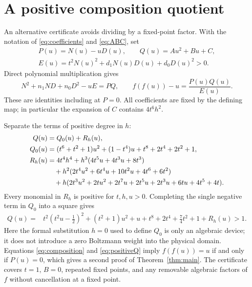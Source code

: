 \documentclass[11pt,a4paper]{article}
\numberwithin{equation}{section}
\begin{document}
\appendix
\section{A positive composition quotient}
\label{sec:certificate}
An alternative certificate avoids dividing by a fixed-point factor.
With the notation of \eqref{eq:coefficients} and \eqref{eq:ABC}, set
\begin{equation}
\begin{gathered}
 P(u)=N(u)-uD(u),\qquad Q(u)=Au^2+Bu+C,\\
 E(u)=t^2N(u)^2+d_1N(u)D(u)+d_0D(u)^2>0.
\end{gathered}
\label{eq:PQE}
\end{equation}
Direct polynomial multiplication gives
\begin{equation}
 N^2+n_1ND+n_0D^2-uE=PQ,
 \qquad f(f(u))-u=\frac{P(u)Q(u)}{E(u)}.
 \label{eq:composition}
\end{equation}
These are identities including at $P=0$. All coefficients are fixed
by the defining map; in particular the expansion of $C$ contains
$4t^6h^2$.

Separate the terms of positive degree in $h$:
\begin{align}
 Q(u)&=Q_0(u)+R_h(u),\label{eq:Qsplit}\\
 Q_0(u)&=(t^6+t^2+1)u^2+(1-t^4)u+t^8+2t^4+2t^2+1,
 \label{eq:Qzero}\\
 R_h(u)&=4t^4h^4+h^3(4t^5u+4t^3u+8t^3)\notag\\
 &\quad+h^2(2t^4u^2+6t^4u+10t^2u+4t^6+6t^2)\notag\\
 &\quad+h(2t^3u^2+2tu^2+2t^7u+2t^5u
              +2t^3u+6tu+4t^5+4t).
 \label{eq:Rh}
\end{align}
Every monomial in $R_h$ is positive for $t,h,u>0$. Completing the
single negative term in $Q_0$ into a square gives
\begin{equation}
\begin{split}
 Q(u)={}&t^2\left(t^2u-\tfrac12\right)^2
 +(t^2+1)u^2+u+t^8+2t^4+\tfrac74t^2+1+R_h(u)>1.
\end{split}
\label{eq:positiveQ}
\end{equation}
Here the formal substitution $h=0$ used to define $Q_0$ is only an
algebraic device; it does not introduce a zero Boltzmann weight into
the physical domain. Equations \eqref{eq:composition} and
\eqref{eq:positiveQ} imply $f(f(u))=u$ if and only if $P(u)=0$,
which gives a second proof of Theorem~\ref{thm:main}. The certificate
covers $t=1$, $B=0$, repeated fixed points, and any removable
algebraic factors of $f$ without cancellation at a fixed point.
\end{document}
